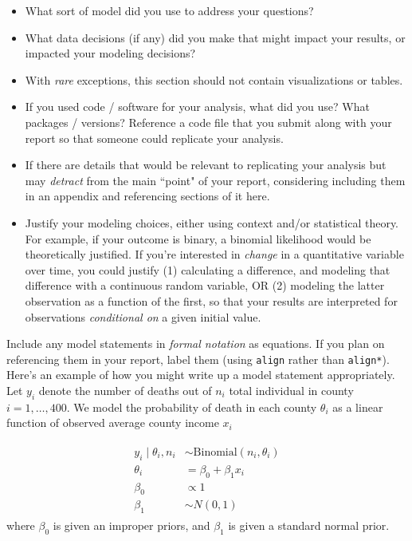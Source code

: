 \documentclass[11pt]{article}
\begin{document}
\begin{itemize}
    \item What sort of model did you use to address your questions?
    \item What data decisions (if any) did you make that might impact your results, or impacted your modeling decisions?
    \item With \textit{rare} exceptions, this section should not contain visualizations or tables.
    \item If you used code / software for your analysis, what did you use? What packages / versions? Reference a code file that you submit along with your report so that someone could replicate your analysis.
    \item If there are details that would be relevant to replicating your analysis but may \textit{detract} from the main ``point" of your report, considering including them in an appendix and referencing sections of it here.
    \item Justify your modeling choices, either using context and/or statistical theory. For example, if your outcome is binary, a binomial likelihood would be theoretically justified. If you're interested in \textit{change} in a quantitative variable over time, you could justify (1) calculating a difference, and modeling that difference with a continuous random variable, OR (2) modeling the latter observation as a function of the first, so that your results are interpreted for observations \textit{conditional on} a given initial value.
\end{itemize}

\noindent Include any model statements in \textit{formal notation} as equations. If you plan on referencing them in your report, label them (using \texttt{align} rather than \texttt{align*}). Here's an example of how you might write up a model statement appropriately. \\

\noindent Let $y_i$ denote the number of deaths out of $n_i$ total individual in county $i = 1, \dots, 400$. We model the probability of death in each county $\theta_i$ as a linear function of observed average county income $x_i$

\begin{align}
\begin{split} %
    y_i \mid \theta_i, n_i & \sim \text{Binomial}(n_{i}, \theta_i) \\
    \theta_i & = \beta_0 + \beta_1 x_i \\
    \beta_0 & \propto 1 \\
    \beta_1 & \sim N(0, 1)
\end{split}
\end{align}
where $\beta_0$ is given an improper priors, and $\beta_1$ is given a standard normal prior.
\end{document}
